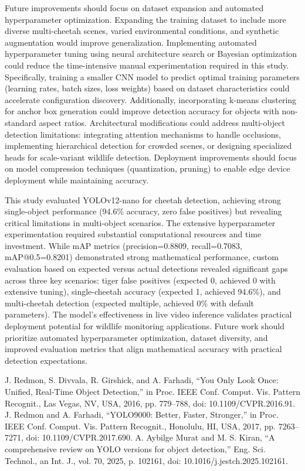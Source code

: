 \documentclass[conference]{IEEEtran}
\begin{document}
Future improvements should focus on dataset expansion and automated hyperparameter optimization. Expanding the training dataset to include more diverse multi-cheetah scenes, varied environmental conditions, and synthetic augmentation would improve generalization. Implementing automated hyperparameter tuning using neural architecture search or Bayesian optimization could reduce the time-intensive manual experimentation required in this study. Specifically, training a smaller CNN model to predict optimal training parameters (learning rates, batch sizes, loss weights) based on dataset characteristics could accelerate configuration discovery. Additionally, incorporating k-means clustering for anchor box generation could improve detection accuracy for objects with non-standard aspect ratios. Architectural modifications could address multi-object detection limitations: integrating attention mechanisms to handle occlusions, implementing hierarchical detection for crowded scenes, or designing specialized heads for scale-variant wildlife detection. Deployment improvements should focus on model compression techniques (quantization, pruning) to enable edge device deployment while maintaining accuracy.

This study evaluated YOLOv12-nano for cheetah detection, achieving strong single-object performance (94.6\% accuracy, zero false positives) but revealing critical limitations in multi-object scenarios. The extensive hyperparameter experimentation required substantial computational resources and time investment. While mAP metrics (precision=0.8809, recall=0.7083, mAP@0.5=0.8201) demonstrated strong mathematical performance, custom evaluation based on expected versus actual detections revealed significant gaps across three key scenarios: tiger false positives (expected 0, achieved 0 with extensive tuning), single-cheetah accuracy (expected 1, achieved 94.6\%), and multi-cheetah detection (expected multiple, achieved 0\% with default parameters). The model's effectiveness in live video inference validates practical deployment potential for wildlife monitoring applications. Future work should prioritize automated hyperparameter optimization, dataset diversity, and improved evaluation metrics that align mathematical accuracy with practical detection expectations.

\begin{thebibliography}{00}
 J. Redmon, S. Divvala, R. Girshick, and A. Farhadi, ``You Only Look Once: Unified, Real-Time Object Detection,'' in Proc. IEEE Conf. Comput. Vis. Pattern Recognit., Las Vegas, NV, USA, 2016, pp. 779--788, doi: 10.1109/CVPR.2016.91.
 J. Redmon and A. Farhadi, ``YOLO9000: Better, Faster, Stronger,'' in Proc. IEEE Conf. Comput. Vis. Pattern Recognit., Honolulu, HI, USA, 2017, pp. 7263--7271, doi: 10.1109/CVPR.2017.690.
 A. Aybilge Murat and M. S. Kiran, ``A comprehensive review on YOLO versions for object detection,'' Eng. Sci. Technol., an Int. J., vol. 70, 2025, p. 102161, doi: 10.1016/j.jestch.2025.102161.
\end{thebibliography}
\end{document}
